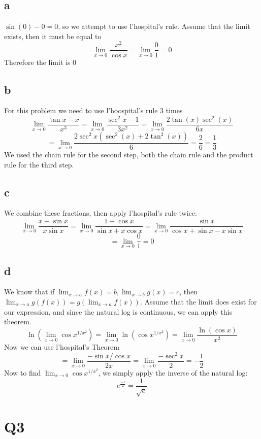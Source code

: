 \documentclass[12pt]{article}
\begin{document}
\subsection{a}
$\sin(0)-0=0$, so we attempt to use l'hospital's rule. Assume that the limit exists, then it must be equal to
$$\lim_{x \to 0}\frac{x^2}{\cos x} = \lim_{x \to 0}\frac{0}{1} = 0$$
Therefore the limit is 0

\subsection{b}
For this problem we need to use l'hoospital's rule 3 times
$$\lim_{x \to 0} \frac{\tan x-x}{x^3} = \lim_{x \to 0} \frac{\sec^2 x-1}{3x^2} = \lim_{x \to 0}\frac{2\tan(x)\sec^2(x)}{6x}$$
$$= \lim_{x \to 0}\frac{2 \sec^2x (\sec^2(x) + 2 \tan^2(x))}{6} = \frac{2}{6} = \frac{1}{3}$$
We used the chain rule for the second step, both the chain rule and the product rule for the third step.

\subsection{c}
We combine these fractions, then apply l'hospital's rule twice:
$$\lim_{x\to 0}\frac{x-\sin x}{x\sin x} = \lim_{x\to 0}\frac{1-\cos x}{\sin x + x\cos x} = \lim_{x\to 0}\frac{\sin x}{\cos x + \sin x - x \sin x} $$
$$= \lim_{x\to 0}\frac{0}{1} = 0$$

\subsection{d}
We know that if $\lim_{x \to a} f(x)=b, \lim_{x \to b} g(x)=c$, then $\lim_{x \to a}g(f(x)) = g(\lim_{x \to a}f(x))$. Assume that the limit does exist for our expression, and since the natural log is continuous, we can apply this theorem.
\newline
$$\ln(\lim_{x \to 0} \cos x ^{1/x^2}) = \lim_{x \to 0} \ln(\cos x^{1/x^2}) = \lim_{x \to 0}\frac{\ln(\cos x)}{x^2}$$
Now we can use l'hospital's Theorem
$$=\lim_{x \to 0}\frac{-\sin x / \cos x}{2x} = \lim_{x \to 0}\frac{- \sec^2 x}{2} = -\frac{1}{2}$$
Now to find $\lim_{x \to 0} \cos x ^{1/x^2}$, we simply apply the inverse of the natural log:
$$e^\frac{-1}{2} = \frac{1}{\sqrt e}$$
\newpage


\section{Q3}
\end{document}
